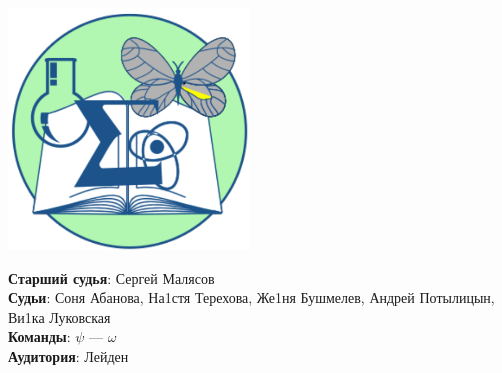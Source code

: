 \documentclass[12pt]{article}
\begin{document}
\begin{minipage}{.30\textwidth}
\begin{center}
\includegraphics[width=0.48\textwidth]{klshlogo.pdf}
\end{center}
\end{minipage}
\begin{minipage}{.65\textwidth}
\begin{flushleft}
{\bf Старший судья}: Сергей Малясов\\ 
{\bf Судьи}: Соня Абанова, На1стя Терехова, Же1ня Бушмелев, Андрей Потылицын, Ви1ка Луковская\\ 
{\bf Команды}: $\psi$ --- $\omega$\\ 
{\bf Аудитория}: Лейден\\ 
\end{flushleft}
\end{minipage}
\end{document}
